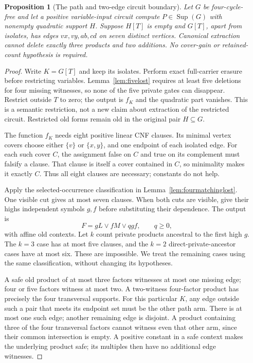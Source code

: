 \documentclass[11pt]{article}
\newcommand{\Sup}{\operatorname{Sup}}
\newtheorem{proposition}[theorem]{Proposition}
\theoremstyle{definition}
\theoremstyle{remark}
\begin{document}
\begin{proposition}[The path and two-edge circuit boundary]\label{prop:paththreeproducts}
Let $G$ be four-cycle-free and let a positive variable-input circuit compute $P\in\Sup(G)$ with nonempty quadratic support $H$. Suppose $H[T]$ is empty and $G[T]$, apart from isolates, has edges $vx,vy,ab,cd$ on seven distinct vertices. Canonical extraction cannot delete exactly three products and two additions. No cover-gain or retained-count hypothesis is required.
\end{proposition}
\begin{proof}
Write $K=G[T]$ and keep its isolates. Perform exact full-carrier erasure before restricting variables. Lemma~\ref{lem:fivelost} requires at least five deletions for four missing witnesses, so none of the five private gates can disappear. Restrict outside $T$ to zero; the output is $f_K$ and the quadratic part vanishes. This is a semantic restriction, not a new claim about extraction of the restricted circuit. Restricted old forms remain old in the original pair $H\subseteq G$.

The function $f_K$ needs eight positive linear CNF clauses. Its minimal vertex covers choose either $\{v\}$ or $\{x,y\}$, and one endpoint of each isolated edge. For each such cover $C$, the assignment false on $C$ and true on its complement must falsify a clause. That clause is itself a cover contained in $C$, so minimality makes it exactly $C$. Thus all eight clauses are necessary; constants do not help.

Apply the selected-occurrence classification in Lemma~\ref{lem:fourmatchinglost}. One visible cut gives at most seven clauses. When both cuts are visible, give their highs independent symbols $g,f$ before substituting their dependence. The output is
\[
 F=gL\vee fM\vee qgf,\qquad q\ge0,
\]
with affine old contexts. Let $k$ count private products ancestral to the first high $g$. The $k=3$ case has at most five clauses, and the $k=2$ direct-private-ancestor cases have at most six. These are impossible. We treat the remaining cases using the same classification, without changing its hypotheses.

A safe old product of at most three factors witnesses at most one missing edge; four or five factors witness at most two. A two-witness four-factor product has precisely the four transversal supports. For this particular $K$, any edge outside such a pair that meets its endpoint set must be the other path arm. There is at most one such edge; another remaining edge is disjoint. A product containing three of the four transversal factors cannot witness even that other arm, since their common intersection is empty. A positive constant in a safe context makes the underlying product safe; its multiples then have no additional edge witnesses.


\end{proof}
\end{document}
